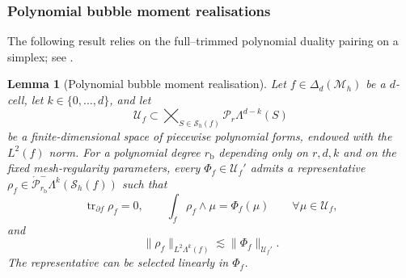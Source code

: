 \documentclass[a4paper,11pt]{article}
\newtheorem{lemma}[theorem]{Lemma}
\theoremstyle{definition}
\newcommand{\Mh}{\mathcal{M}_h}
\newcommand{\Sh}{\mathcal{S}_h}
\newcommand{\FM}[1]{\Delta_{#1}}
\newcommand{\PL}[2]{\mathcal{P}_{#1}\Lambda^{#2}}
\newcommand{\trc}{\operatorname{tr}}
\newcommand{\PLtrimz}[2]{\mathring{\mathcal P}_{#1}^{-}\Lambda^{#2}}
\begin{document}
\subsubsection{Polynomial bubble moment realisations}
\label{subsubsec:trace.and.bubble}

The following result relies on the full--trimmed polynomial duality pairing on a simplex; see \cite[Corollary~3.3]{Berchenko-Kogan:21}.
\begin{lemma}[Polynomial bubble moment realisation]
\label{lem:polynomial.bubble.moment.realisation}
Let $f\in\FM{d}(\Mh)$ be a $d$-cell, let $k\in\{0,\ldots,d\}$, and let
\[
\mathcal U_f
\subset
\bigtimes_{S\in\Sh(f)}\PL{r}{d-k}(S)
\]
be a finite-dimensional space of piecewise polynomial forms, endowed with the $L^2(f)$ norm.
For a polynomial degree $r_{\mathrm b}$ depending only on $r,d,k$ and on the fixed mesh-regularity parameters, every $\Phi_f\in\mathcal U_f'$ admits a representative $\rho_f\in\PLtrimz{r_{\mathrm b}}{k}(\Sh(f))$ such that
\[
\trc_{\partial f}\rho_f=0,
\qquad
\int_f\rho_f\wedge\mu
=
\Phi_f(\mu)
\qquad
\forall\mu\in\mathcal U_f,
\]
and
\[
\|\rho_f\|_{L^2\Lambda^k(f)}
\lesssim
\|\Phi_f\|_{\mathcal U_f'}.
\]
The representative can be selected linearly in $\Phi_f$.
\end{lemma}
\end{document}
